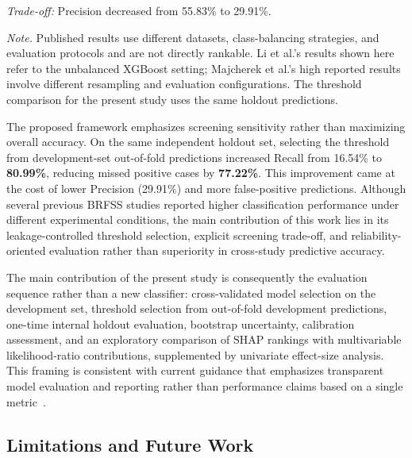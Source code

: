 \documentclass[pdflatex,sn-basic,Numbered]{sn-jnl}
\begin{document}
\begin{table}[htbp]
\begin{minipage}{\linewidth}
\par\vspace{1mm}
\textit{Trade-off:}
Precision decreased from 55.83\% to 29.91\%.

\par\vspace{1mm}
\textit{Note.}
Published results use different datasets, class-balancing
strategies, and evaluation protocols and are not directly
rankable. Li et al.'s results shown here refer to the
unbalanced XGBoost setting; Majcherek et al.'s high
reported results involve different resampling and
evaluation configurations.
The threshold comparison for the present study uses
the same holdout predictions.
\end{minipage}

\end{table}


The proposed framework emphasizes screening sensitivity rather than maximizing overall accuracy. On the same independent holdout set, selecting the threshold from development-set out-of-fold predictions increased Recall from 16.54\% to \textbf{80.99\%}, reducing missed positive cases by \textbf{77.22\%}. This improvement came at the cost of lower Precision (29.91\%) and more false-positive predictions. Although several previous BRFSS studies reported higher classification performance under different experimental conditions, the main contribution of this work lies in its leakage-controlled threshold selection, explicit screening trade-off, and reliability-oriented evaluation rather than superiority in cross-study predictive accuracy.

The main contribution of the present study is consequently the evaluation
sequence rather than a new classifier: cross-validated model selection on the
development set, threshold selection from out-of-fold development predictions,
one-time internal holdout evaluation, bootstrap uncertainty, calibration
assessment, and an exploratory comparison of SHAP rankings with multivariable likelihood-ratio contributions, supplemented by univariate effect-size analysis. This framing is consistent with current guidance that
emphasizes transparent model evaluation and reporting rather than performance
claims based on a single metric~\citep{collins2024tripodai,moons2025probastai}.



\subsection{Limitations and Future Work}
\label{subsec:limitations}
\end{document}

